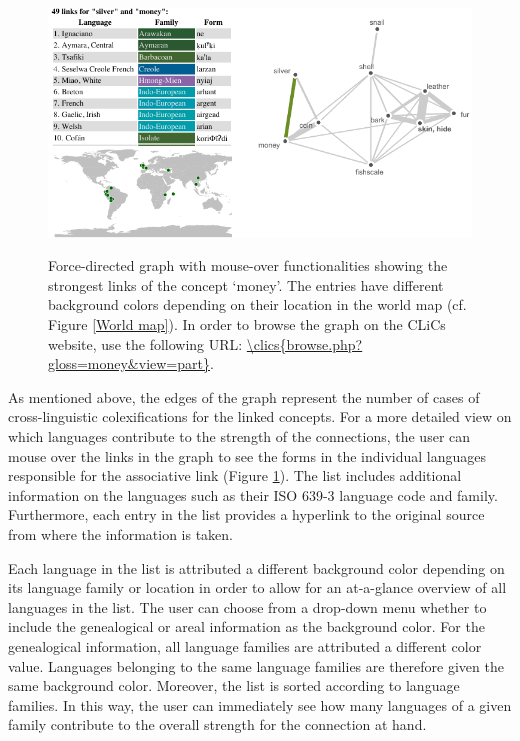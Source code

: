 \begin{figure}[htbp]
\begin{center}
    \href{\clics{browse.php?gloss=money&view=part}}{\includegraphics[width=\textwidth]{img/silver-image.pdf}}
\caption{Force-directed graph with mouse-over functionalities showing the strongest links of the
concept `{money}'. The entries have different background colors depending on their location in the
world map (cf. Figure \ref{World map}). In order to browse the graph on the CLiCs website, use the
following URL: \url{\clics{browse.php?gloss=money&view=part}}.}
\label{MoneySilver}
\end{center}
\end{figure}




As mentioned above, the edges of the graph represent the number of cases of cross-linguistic colexifications for the linked concepts. For a more detailed view on which languages contribute to the strength of the connections, the user can mouse over the links in the graph to see the forms in the individual languages responsible for the associative link (Figure \ref{MoneySilver}). The list includes additional information on the languages such as their ISO 639-3 language code and family. Furthermore, each entry in the list provides a hyperlink to the original source from where the information is taken.  


Each language in the list is attributed a different background color depending on its language family or location in order to allow for an at-a-glance overview of all languages in the list. The user can choose from a drop-down menu whether to include the genealogical or areal information as the background color. For the genealogical information, all language families are attributed a different color value. Languages belonging to the same language families are therefore given the same background color. Moreover, the list is sorted according to language families. In this way, the user can immediately see how many languages of  a given family contribute to the overall strength for the connection at hand. 

